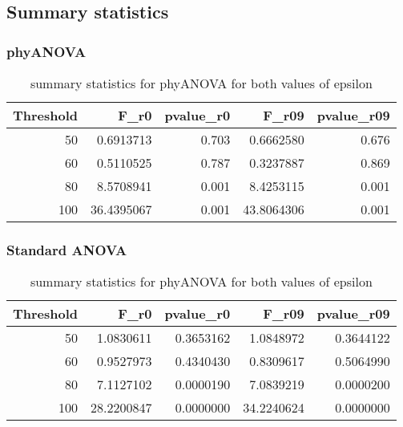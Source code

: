 \documentclass[]{article}
\begin{document}
\hypertarget{summary-statistics-3}{%
\subsection{Summary statistics}\label{summary-statistics-3}}

\hypertarget{phyanova-6}{%
\subsubsection{phyANOVA}\label{phyanova-6}}

\begin{table}[H]

\caption{\label{tab:unnamed-chunk-40}summary statistics for phyANOVA for both values of epsilon}
\centering
\begin{tabular}{r|r|r|r|r}
\hline
Threshold & F\_r0 & pvalue\_r0 & F\_r09 & pvalue\_r09\\
\hline
50 & 0.6913713 & 0.703 & 0.6662580 & 0.676\\
\hline
60 & 0.5110525 & 0.787 & 0.3237887 & 0.869\\
\hline
80 & 8.5708941 & 0.001 & 8.4253115 & 0.001\\
\hline
100 & 36.4395067 & 0.001 & 43.8064306 & 0.001\\
\hline
\end{tabular}
\end{table}

\hypertarget{standard-anova-6}{%
\subsubsection{Standard ANOVA}\label{standard-anova-6}}

\begin{table}[H]

\caption{\label{tab:unnamed-chunk-41}summary statistics for phyANOVA for both values of epsilon}
\centering
\begin{tabular}{r|r|r|r|r}
\hline
Threshold & F\_r0 & pvalue\_r0 & F\_r09 & pvalue\_r09\\
\hline
50 & 1.0830611 & 0.3653162 & 1.0848972 & 0.3644122\\
\hline
60 & 0.9527973 & 0.4340430 & 0.8309617 & 0.5064990\\
\hline
80 & 7.1127102 & 0.0000190 & 7.0839219 & 0.0000200\\
\hline
100 & 28.2200847 & 0.0000000 & 34.2240624 & 0.0000000\\
\hline
\end{tabular}
\end{table}
\end{document}
